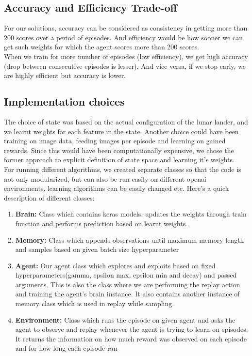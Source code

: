  \subsection{Accuracy and Efficiency Trade-off}

For our solutions, accuracy can be considered as consistency in getting more than 200 scores over a period of episodes. And efficiency would be how sooner we can get such weights for which the agent scores more than 200 scores. \\

When we train for more number of episodes (low efficiency), we get high accuracy (drop between consecutive episodes is lesser). And vice versa, if we stop early, we are highly efficient but accuracy is lower.

\subsection{Implementation choices}

The choice of state was based on the actual configuration of the lunar lander, and we learnt weights for each feature in the state. Another choice could have been training on image data, feeding images per episode and learning on gained rewards. Since this would have been computationally expensive, we chose the former approach to explicit definition of state space and learning it's weights. \\

For running different algorithms, we created separate classes so that the code is not only modularized, but can also be run easily on different openai environments, learning algorithms can be easily changed etc. Here's a quick description of different classes:

\begin{enumerate}
\item \textbf{Brain:} Class which contains keras models, updates the weights through train function and performs prediction based on learnt weights. 
\item \textbf{Memory:} Class which appends observations until maximum memory length and samples based on given batch size hyperparameter
\item \textbf{Agent:} Our agent class which explores and exploits based on fixed hyperparameters(gamma, epsilon max, epsilon min and decay) and passed arguments. This is also the class where we are performing the replay action and training the agent's brain instance. It also contains another instance of memory class which is used in replay while sampling.
\item \textbf{Environment:} Class which runs the episode on given agent and asks the agent to observe and replay whenever the agent is trying to learn on episodes. It returns the information on how much reward was observed on each episode and for how long each episode ran
\end{enumerate}
